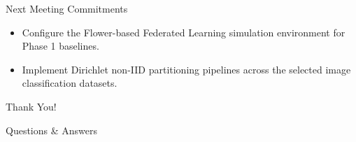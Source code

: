 \documentclass[11pt, aspectratio=169]{beamer}
\begin{document}
\begin{frame}{Next Meeting Commitments}
    \begin{itemize}
        \item Configure the Flower-based Federated Learning simulation environment for Phase 1 baselines.
        \item Implement Dirichlet non-IID partitioning pipelines across the selected image classification datasets.
    \end{itemize}
\end{frame}

\begin{frame}[standout]
    Thank You!
    \vspace{0.5cm}

    \begin{center}
        \large Questions \& Answers
    \end{center}
\end{frame}
\end{document}
